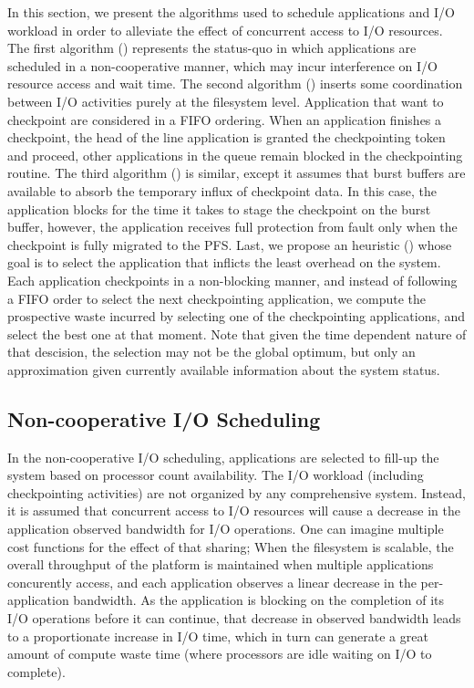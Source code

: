 In this section, we present the algorithms used to schedule applications
and I/O workload in order to alleviate the effect of concurrent access
to I/O resources. The first algorithm (\nocoop) represents the status-quo  in
which applications are scheduled in a non-cooperative manner, which may
incur interference on I/O resource access and wait time. The second
algorithm (\fifoblock) inserts some coordination between I/O activities purely at
the filesystem level. Application that want to checkpoint are considered in
a FIFO ordering. When an application finishes a checkpoint, the head of
the line application is granted the checkpointing token and proceed,
other applications in the queue remain blocked in the checkpointing
routine. The third algorithm (\fifononblock) is similar, except it assumes
that burst buffers are available to absorb the temporary influx of
checkpoint data. In this case, the application blocks for the time it
takes to stage the checkpoint on the burst buffer, however, the application
receives full protection from fault only when the checkpoint is fully
migrated to the PFS. Last, we propose an heuristic (\leastwaste) whose goal is to
select the application that inflicts the least overhead on the system.
Each application checkpoints in a non-blocking manner, and instead of
following a FIFO order to select the next checkpointing application,
we compute the prospective waste incurred by selecting one of the
checkpointing applications, and select the best one at that moment. Note
that given the time dependent nature of that descision, the selection may
not be the global optimum, but only an approximation given currently
available information about the system status.

\subsection{Non-cooperative I/O Scheduling}

In the non-cooperative I/O scheduling, applications are selected to
fill-up the system based on processor count availability. The I/O
workload (including checkpointing activities) are not organized by any
comprehensive system. Instead, it is assumed that concurrent access
to I/O resources will cause a decrease in the application observed
bandwidth for I/O operations. One can imagine multiple cost functions
for the effect of that sharing; When the filesystem is scalable, the
overall throughput of the platform is maintained when multiple applications
concurently access, and each application observes a linear decrease in
the per-application bandwidth. As the application is blocking on the
completion of its I/O operations before it can continue, that decrease
in observed bandwidth leads to a proportionate increase in I/O time,
which in turn can generate a great amount of compute waste time
(where processors are idle waiting on I/O to complete).

